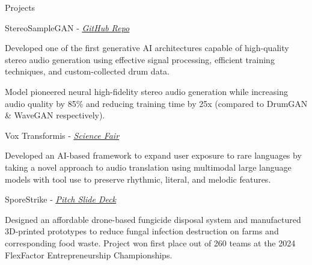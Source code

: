 \documentclass[
  10pt, %
]{resume}
\begin{document}
\begin{rSection}{Projects}

  
    \begin{rSubsection}{StereoSampleGAN - \textit{\underline{\href{https://github.com/shuklabhay/stereo-sample-gan}{GitHub Repo}}}}{}{}{}
        
      \item Developed one of the first generative AI architectures capable of high-quality stereo audio generation using effective signal processing, efficient training techniques, and custom-collected drum data.
          
      \item Model pioneered neural high-fidelity stereo audio generation while increasing audio quality by 85\% and reducing training time by 25x (compared to DrumGAN \& WaveGAN respectively).
          
    \end{rSubsection}
        
    \begin{rSubsection}{Vox Transformis - \textit{\underline{\href{https://science-fair.org/}{Science Fair}}}}{}{}{}
        
      \item Developed an AI-based framework to expand user exposure to rare languages by taking a novel approach to audio translation using multimodal large language models with tool use to preserve rhythmic, literal, and melodic features.
          
    \end{rSubsection}
        
    \begin{rSubsection}{SporeStrike - \textit{\underline{\href{https://shuklabhay.github.io/static/projects/sporestrike/FlexFactor_SporeStrike_pitch.pdf}{Pitch Slide Deck}}}}{}{}{}
        
      \item Designed an affordable drone-based fungicide disposal system and manufactured 3D-printed prototypes to reduce fungal infection destruction on farms and corresponding food waste. Project won first place out of 260 teams at the 2024 FlexFactor Entrepreneurship Championships.
          
    \end{rSubsection}
        

\end{rSection}
    
\end{document}
